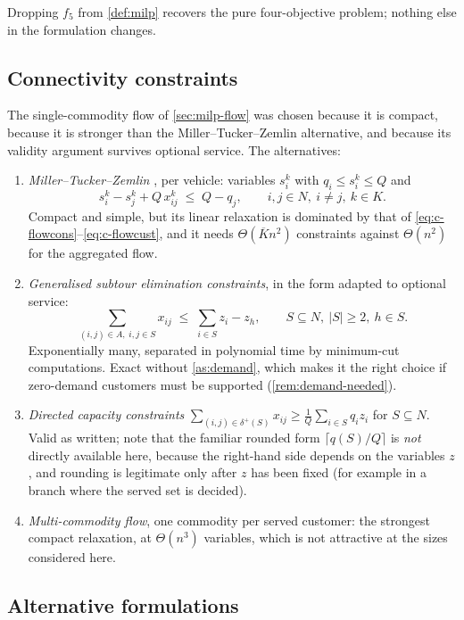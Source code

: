 \documentclass[11pt,a4paper]{article}
\theoremstyle{definition}
\theoremstyle{plain}
\newcommand{\Arcs}{A}
\newcommand{\Cust}{N}
\newcommand{\Veh}{K}
\begin{document}
Dropping $f_5$ from \cref{def:milp} recovers the pure four-objective problem;
nothing else in the formulation changes.

\subsection{Connectivity constraints}
\label{sec:alt-sec}

The single-commodity flow of \cref{sec:milp-flow} was chosen because it is
compact, because it is stronger than the Miller--Tucker--Zemlin alternative,
and because its validity argument survives optional service.  The alternatives:

\begin{enumerate}[label=(\alph*),leftmargin=*]
\item \emph{Miller--Tucker--Zemlin} \cite{MTZ1960}, per vehicle: variables
  $s^k_i$ with $q_i \le s^k_i \le Q$ and
  \[
    s^k_i - s^k_j + Q\,x^k_{ij} \;\le\; Q - q_j,
    \qquad i,j \in \Cust,\ i \ne j,\ k \in \Veh .
  \]
  Compact and simple, but its linear relaxation is dominated by that of
  \eqref{eq:c-flowcons}--\eqref{eq:c-flowcust}, and it needs
  $\Theta(\overline{K} n^2)$ constraints against $\Theta(n^2)$ for the
  aggregated flow.
\item \emph{Generalised subtour elimination constraints}, in the form adapted
  to optional service:
  \[
    \sum_{(i,j) \in \Arcs,\; i,j \in S} x_{ij}
      \;\le\; \sum_{i \in S} z_i - z_h,
    \qquad S \subseteq \Cust,\ |S| \ge 2,\ h \in S .
  \]
  Exponentially many, separated in polynomial time by minimum-cut
  computations.  Exact without \cref{as:demand}, which makes it the right
  choice if zero-demand customers must be supported
  (\cref{rem:demand-needed}).
\item \emph{Directed capacity constraints}
  $\sum_{(i,j) \in \delta^+(S)} x_{ij} \ge \frac{1}{Q}\sum_{i \in S} q_i z_i$
  for $S \subseteq \Cust$.  Valid as written; note that the familiar rounded
  form $\lceil q(S)/Q \rceil$ is \emph{not} directly available here, because
  the right-hand side depends on the variables $z$, and rounding is legitimate
  only after $z$ has been fixed (for example in a branch where the served set
  is decided).
\item \emph{Multi-commodity flow}, one commodity per served customer: the
  strongest compact relaxation, at $\Theta(n^3)$ variables, which is not
  attractive at the sizes considered here.
\end{enumerate}

\subsection{Alternative formulations}
\label{sec:alt-formulations}
\end{document}
